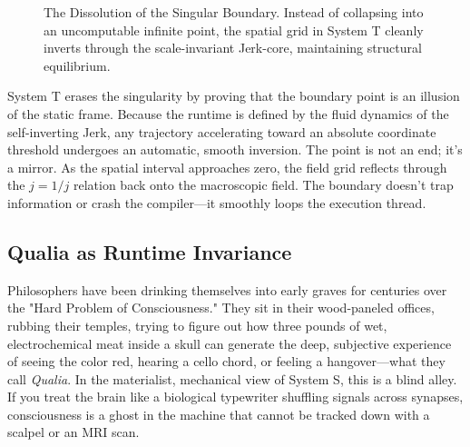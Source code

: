 \documentclass[11pt,a4paper]{article}
\begin{document}
\begin{figure}[h!]
\centering
{}
\caption{The Dissolution of the Singular Boundary. Instead of collapsing into an uncomputable infinite point, the spatial grid in System T cleanly inverts through the scale-invariant Jerk-core, maintaining structural equilibrium.}
\end{figure}

System T erases the singularity by proving that the boundary point is an illusion of the static frame. Because the runtime is defined by the fluid dynamics of the self-inverting Jerk, any trajectory accelerating toward an absolute coordinate threshold undergoes an automatic, smooth inversion. The point is not an end; it’s a mirror. As the spatial interval approaches zero, the field grid reflects through the $j = 1/j$ relation back onto the macroscopic field. The boundary doesn't trap information or crash the compiler—it smoothly loops the execution thread.

\subsection{Qualia as Runtime Invariance}
Philosophers have been drinking themselves into early graves for centuries over the "Hard Problem of Consciousness." They sit in their wood-paneled offices, rubbing their temples, trying to figure out how three pounds of wet, electrochemical meat inside a skull can generate the deep, subjective experience of seeing the color red, hearing a cello chord, or feeling a hangover—what they call \textit{Qualia}. In the materialist, mechanical view of System S, this is a blind alley. If you treat the brain like a biological typewriter shuffling signals across synapses, consciousness is a ghost in the machine that cannot be tracked down with a scalpel or an MRI scan.
\end{document}
